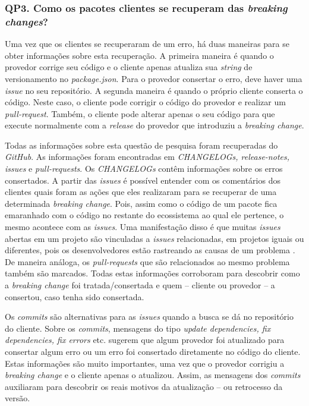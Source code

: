 \subsubsection{QP3. Como os pacotes clientes se recuperam das \textit{breaking changes}?}
\label{apr:rq3}
Uma vez que os clientes se recuperaram de um erro, há duas maneiras para se obter informações sobre esta recuperação. A primeira maneira é quando o provedor corrige seu código e o cliente apenas atualiza sua \textit{string} de versionamento no \textit{package.json}. Para o provedor consertar o erro, deve haver uma \textit{issue} no seu repositório. A segunda maneira é quando o próprio cliente conserta o código. Neste caso, o cliente pode corrigir o código do provedor e realizar um \textit{pull-request}. Também, o cliente pode alterar apenas o seu código para que execute normalmente com a \textit{release} do provedor que introduziu a \textit{breaking change}.

Todas as informações sobre esta questão de pesquisa foram recuperadas do \textit{GitHub}. As informações foram encontradas em \textit{CHANGELOGs, release-notes, issues} e \textit{pull-requests}. Os \textit{CHANGELOGs} contêm informações sobre os erros consertados. A partir das \textit{issues} é possível entender com os comentários dos clientes quais foram as ações que eles realizaram para se recuperar de uma determinada \textit{breaking change}. Pois, assim como o código de um pacote fica emaranhado com o código no restante do ecossistema ao qual ele pertence, o mesmo acontece com as \textit{issues}. Uma manifestação disso é que muitas \textit{issues} abertas em um projeto são vinculadas a \textit{issues} relacionadas, em projetos iguais ou diferentes, pois os desenvolvedores estão rastreando as causas de um problema \cite{Zhang:2018:WIL:3242887.3242891}. De maneira análoga, os \textit{pull-requests} que são relacionados ao mesmo problema também são marcados. Todas estas informações corroboram para descobrir como a \textit{breaking change} foi tratada/consertada e quem -- cliente ou provedor -- a consertou, caso tenha sido consertada.

Os \textit{commits} são alternativas para as \textit{issues} quando a busca se dá no repositório do cliente. Sobre os \textit{commits}, mensagens do tipo \textit{update dependencies, fix dependencies, fix errors} etc. sugerem que algum provedor foi atualizado para consertar algum erro ou um erro foi consertado diretamente no código do cliente. Estas informações são muito importantes, uma vez que o provedor corrigiu a \textit{breaking change} e o cliente apenas o atualizou. Assim, as mensagens dos \textit{commits} auxiliaram para descobrir os reais motivos da atualização -- ou retrocesso da versão.